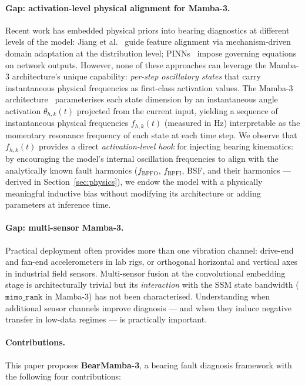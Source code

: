 \paragraph{Gap: activation-level physical alignment for Mamba-3.}
Recent work has embedded physical priors into bearing diagnostics at
different levels of the model: Jiang et al.~\cite{jiang2025mechanism} guide
feature alignment via mechanism-driven domain adaptation at the
distribution level; PINNs~\cite{raissi2019physics,willard2022physics}
impose governing equations on network outputs.
However, none of these approaches can leverage the Mamba-3 architecture's
unique capability: \emph{per-step oscillatory states} that carry instantaneous
physical frequencies as first-class activation values.
The Mamba-3 architecture~\cite{mamba3_2026} parameterises each state
dimension by an instantaneous angle activation $\theta_{h,k}(t)$
projected from the current input, yielding a sequence of instantaneous
physical frequencies $f_{h,k}(t)$ (measured in Hz) interpretable as the
momentary resonance frequency of each state at each time step.
We observe that $f_{h,k}(t)$ provides a direct \emph{activation-level hook}
for injecting bearing kinematics: by encouraging the model's internal
oscillation frequencies to align with the analytically known fault harmonics
($f_{\text{BPFO}}$, $f_{\text{BPFI}}$, BSF, and their harmonics —
derived in Section~\ref{sec:physics}), we endow the model with a
physically meaningful inductive bias without modifying its architecture
or adding parameters at inference time.

\paragraph{Gap: multi-sensor Mamba-3.}
Practical deployment often provides more than one vibration channel:
drive-end and fan-end accelerometers in lab rigs, or orthogonal
horizontal and vertical axes in industrial field sensors.
Multi-sensor fusion at the convolutional embedding stage is architecturally
trivial but its \emph{interaction} with the SSM state bandwidth
($\texttt{mimo\_rank}$ in Mamba-3) has not been characterised.
Understanding when additional sensor channels improve diagnosis — and when
they induce negative transfer in low-data regimes — is practically important.

\paragraph{Contributions.}
This paper proposes \textbf{BearMamba-3}, a bearing fault diagnosis framework
with the following four contributions:

